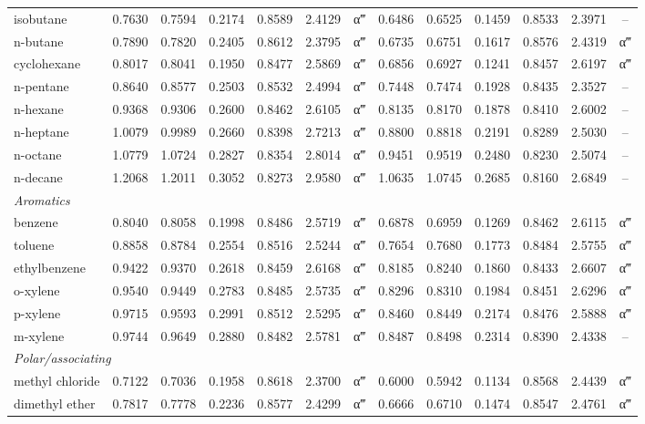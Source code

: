 \begin{table}[H]
\begin{tabular}{lcccccccccccc}
isobutane & 0.7630 & 0.7594 & 0.2174 & 0.8589 & 2.4129 & α‴ & 0.6486 & 0.6525 & 0.1459 & 0.8533 & 2.3971 & -- \\
n-butane & 0.7890 & 0.7820 & 0.2405 & 0.8612 & 2.3795 & α‴ & 0.6735 & 0.6751 & 0.1617 & 0.8576 & 2.4319 & α‴ \\
cyclohexane & 0.8017 & 0.8041 & 0.1950 & 0.8477 & 2.5869 & α‴ & 0.6856 & 0.6927 & 0.1241 & 0.8457 & 2.6197 & α‴ \\
n-pentane & 0.8640 & 0.8577 & 0.2503 & 0.8532 & 2.4994 & α‴ & 0.7448 & 0.7474 & 0.1928 & 0.8435 & 2.3527 & -- \\
n-hexane & 0.9368 & 0.9306 & 0.2600 & 0.8462 & 2.6105 & α‴ & 0.8135 & 0.8170 & 0.1878 & 0.8410 & 2.6002 & -- \\
n-heptane & 1.0079 & 0.9989 & 0.2660 & 0.8398 & 2.7213 & α‴ & 0.8800 & 0.8818 & 0.2191 & 0.8289 & 2.5030 & -- \\
n-octane & 1.0779 & 1.0724 & 0.2827 & 0.8354 & 2.8014 & α‴ & 0.9451 & 0.9519 & 0.2480 & 0.8230 & 2.5074 & -- \\
n-decane & 1.2068 & 1.2011 & 0.3052 & 0.8273 & 2.9580 & α‴ & 1.0635 & 1.0745 & 0.2685 & 0.8160 & 2.6849 & -- \\
\multicolumn{13}{l}{\emph{Aromatics}} \\
benzene & 0.8040 & 0.8058 & 0.1998 & 0.8486 & 2.5719 & α‴ & 0.6878 & 0.6959 & 0.1269 & 0.8462 & 2.6115 & α‴ \\
toluene & 0.8858 & 0.8784 & 0.2554 & 0.8516 & 2.5244 & α‴ & 0.7654 & 0.7680 & 0.1773 & 0.8484 & 2.5755 & α‴ \\
ethylbenzene & 0.9422 & 0.9370 & 0.2618 & 0.8459 & 2.6168 & α‴ & 0.8185 & 0.8240 & 0.1860 & 0.8433 & 2.6607 & α‴ \\
o-xylene & 0.9540 & 0.9449 & 0.2783 & 0.8485 & 2.5735 & α‴ & 0.8296 & 0.8310 & 0.1984 & 0.8451 & 2.6296 & α‴ \\
p-xylene & 0.9715 & 0.9593 & 0.2991 & 0.8512 & 2.5295 & α‴ & 0.8460 & 0.8449 & 0.2174 & 0.8476 & 2.5888 & α‴ \\
m-xylene & 0.9744 & 0.9649 & 0.2880 & 0.8482 & 2.5781 & α‴ & 0.8487 & 0.8498 & 0.2314 & 0.8390 & 2.4338 & -- \\
\multicolumn{13}{l}{\emph{Polar/associating}} \\
methyl chloride & 0.7122 & 0.7036 & 0.1958 & 0.8618 & 2.3700 & α‴ & 0.6000 & 0.5942 & 0.1134 & 0.8568 & 2.4439 & α‴ \\
dimethyl ether & 0.7817 & 0.7778 & 0.2236 & 0.8577 & 2.4299 & α‴ & 0.6666 & 0.6710 & 0.1474 & 0.8547 & 2.4761 & α‴ \\

\end{tabular}
\end{table}
